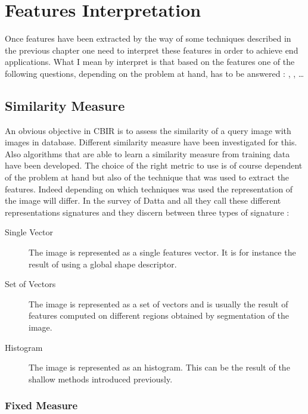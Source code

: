 \chapter{Features Interpretation}

    Once features have been extracted by the way of some techniques described in the previous chapter one need to interpret these features in order to achieve end applications. What I mean by interpret is that based on the features one of the following questions, depending on the problem at hand, has to be answered : , ,  \ldots

    \section{Similarity Measure}

    An obvious objective in CBIR is to assess the similarity of a query image with images in database. Different similarity measure have been investigated for this. Also algorithms that are able to learn a similarity measure from training data have been developed. The choice of the right metric to use is of course dependent of the problem at hand but also of the technique that was used to extract the features. Indeed depending on which techniques was used the representation of the image will differ. In the survey of Datta and all \cite{datta2008image} they call these different representations signatures and they discern between three types of signature :

    \begin{description}
      \item[Single Vector] The image is represented as a single features vector. It is for instance the result of using a global shape descriptor.

      \item[Set of Vectors] The image is represented as a set of vectors and is usually the result of features computed on different regions obtained by segmentation of the image.

      \item[Histogram] The image is represented as an histogram. This can be the result of the shallow methods introduced previously.

    \end{description}

      \subsection{Fixed Measure}

